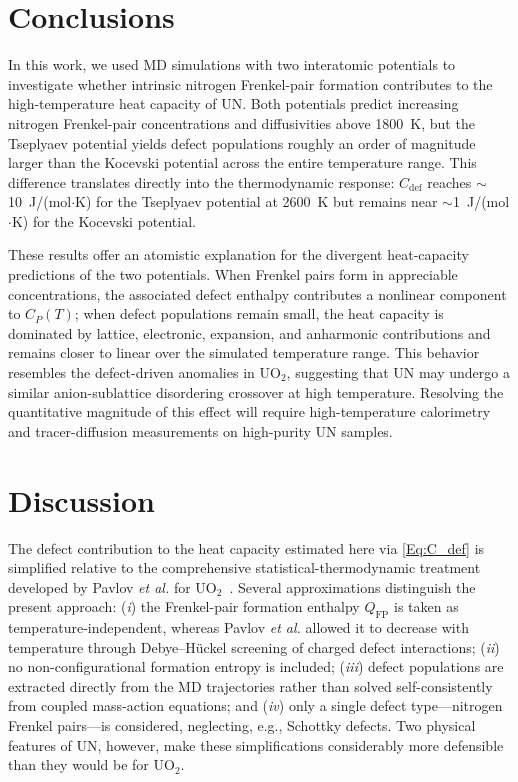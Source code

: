 \documentclass[preprint,12pt,sort&compress]{elsarticle}
\newcommand{\?}{\stackrel{?}{=}}
\begin{document}
\section{Conclusions}

In this work, we used MD simulations with two interatomic potentials to investigate whether intrinsic nitrogen Frenkel-pair formation contributes to the high-temperature heat capacity of UN. Both potentials predict increasing nitrogen Frenkel-pair concentrations and diffusivities above 1800~K, but the Tseplyaev potential yields defect populations roughly an order of magnitude larger than the Kocevski potential across the entire temperature range. This difference translates directly into the thermodynamic response: $C_\text{def}$ reaches $\sim$10~J/(mol$\cdot$K) for the Tseplyaev potential at 2600~K but remains near $\sim$1~J/(mol$\cdot$K) for the Kocevski potential.

These results offer an atomistic explanation for the divergent heat-capacity predictions of the two potentials. When Frenkel pairs form in appreciable concentrations, the associated defect enthalpy contributes a nonlinear component to $C_P(T)$; when defect populations remain small, the heat capacity is dominated by lattice, electronic, expansion, and anharmonic contributions and remains closer to linear over the simulated temperature range. This behavior resembles the defect-driven anomalies in UO$_2$, suggesting that UN may undergo a similar anion-sublattice disordering crossover at high temperature. Resolving the quantitative magnitude of this effect will require high-temperature calorimetry and tracer-diffusion measurements on high-purity UN samples.

\section{Discussion}

The defect contribution to the heat capacity estimated here via \cref{Eq:C_def} is simplified relative to the comprehensive statistical-thermodynamic treatment developed by Pavlov \textit{et al.} for UO$_2$~\cite{Pavlov2017}. Several approximations distinguish the present approach: (\textit{i}) the Frenkel-pair formation enthalpy $Q_\text{FP}$ is taken as temperature-independent, whereas Pavlov \textit{et al.} allowed it to decrease with temperature through Debye--H\"{u}ckel screening of charged defect interactions; (\textit{ii}) no non-configurational formation entropy is included; (\textit{iii}) defect populations are extracted directly from the MD trajectories rather than solved self-consistently from coupled mass-action equations; and (\textit{iv}) only a single defect type---nitrogen Frenkel pairs---is considered, neglecting, e.g., Schottky defects. Two physical features of UN, however, make these simplifications considerably more defensible than they would be for UO$_2$.
\end{document}
